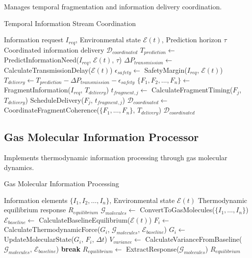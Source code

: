 \documentclass[12pt,a4paper]{article}
\begin{document}
Manages temporal fragmentation and information delivery coordination.

\begin{algorithm}
\caption{Temporal Information Stream Coordination}
\begin{algorithmic}[1]
\Require Information request $I_{req}$, Environmental state $\mathcal{E}(t)$, Prediction horizon $\tau$
\Ensure Coordinated information delivery $\mathcal{D}_{coordinated}$
\State $T_{prediction} \leftarrow$ PredictInformationNeed($I_{req}$, $\mathcal{E}(t)$, $\tau$)
\State $\Delta P_{transmission} \leftarrow$ CalculateTransmissionDelay($\mathcal{E}(t)$)
\State $\epsilon_{safety} \leftarrow$ SafetyMargin($I_{req}$, $\mathcal{E}(t)$)
\State $T_{delivery} \leftarrow T_{prediction} - \Delta P_{transmission} - \epsilon_{safety}$
\State $\{F_1, F_2, \ldots, F_n\} \leftarrow$ FragmentInformation($I_{req}$, $T_{delivery}$)
    \State $t_{fragment,j} \leftarrow$ CalculateFragmentTiming($F_j$, $T_{delivery}$)
    \State ScheduleDelivery($F_j$, $t_{fragment,j}$)
\EndFor
\State $\mathcal{D}_{coordinated} \leftarrow$ CoordinateFragmentCoherence($\{F_1, \ldots, F_n\}$, $T_{delivery}$)
\State \Return $\mathcal{D}_{coordinated}$
\end{algorithmic}
\end{algorithm}

\subsection{Gas Molecular Information Processor}

Implements thermodynamic information processing through gas molecular dynamics.

\begin{algorithm}
\caption{Gas Molecular Information Processing}
\begin{algorithmic}[1]
\Require Information elements $\{I_1, I_2, \ldots, I_n\}$, Environmental state $\mathcal{E}(t)$
\Ensure Thermodynamic equilibrium response $R_{equilibrium}$
\State $\mathcal{G}_{molecules} \leftarrow$ ConvertToGasMolecules($\{I_1, \ldots, I_n\}$)
\State $\mathcal{E}_{baseline} \leftarrow$ CalculateBaselineEquilibrium($\mathcal{E}(t)$)
        \State $F_i \leftarrow$ CalculateThermodynamicForce($G_i$, $\mathcal{G}_{molecules}$, $\mathcal{E}_{baseline}$)
        \State $G_i \leftarrow$ UpdateMolecularState($G_i$, $F_i$, $\Delta t$)
    \EndFor
    \State $V_{variance} \leftarrow$ CalculateVarianceFromBaseline($\mathcal{G}_{molecules}$, $\mathcal{E}_{baseline}$)
        \State \textbf{break}
    \EndIf
\EndFor
\State $R_{equilibrium} \leftarrow$ ExtractResponse($\mathcal{G}_{molecules}$)
\State \Return $R_{equilibrium}$
\end{algorithmic}
\end{algorithm}
\end{document}

